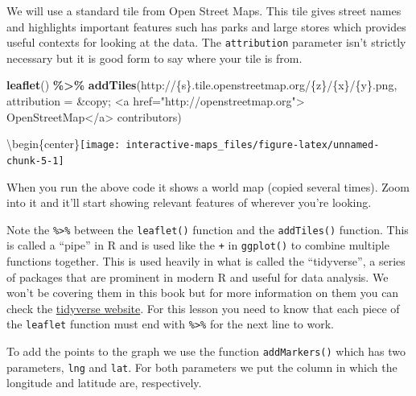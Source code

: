 \documentclass[
  12pt,
]{book}
\newenvironment{Shaded}{\begin{snugshade}}{\end{snugshade}}
\newcommand{\DataTypeTok}[1]{\textcolor[rgb]{0.13,0.29,0.53}{#1}}
\newcommand{\KeywordTok}[1]{\textcolor[rgb]{0.13,0.29,0.53}{\textbf{#1}}}
\newcommand{\NormalTok}[1]{#1}
\newcommand{\OperatorTok}[1]{\textcolor[rgb]{0.81,0.36,0.00}{\textbf{#1}}}
\newcommand{\StringTok}[1]{\textcolor[rgb]{0.31,0.60,0.02}{#1}}
\begin{document}
We will use a standard tile from Open Street Maps. This tile gives street names and highlights important features such has parks and large stores which provides useful contexts for looking at the data. The \texttt{attribution} parameter isn't strictly necessary but it is good form to say where your tile is from.

\begin{Shaded}
\begin{Highlighting}[]
\KeywordTok{leaflet}\NormalTok{() }\OperatorTok{\%>\%}\StringTok{ }
\StringTok{  }\KeywordTok{addTiles}\NormalTok{(}\StringTok{\textquotesingle{}http://\{s\}.tile.openstreetmap.org/\{z\}/\{x\}/\{y\}.png\textquotesingle{}}\NormalTok{, }
           \DataTypeTok{attribution =} \StringTok{\textquotesingle{}\&copy; <a href="http://openstreetmap.org">}
\StringTok{                OpenStreetMap</a> contributors\textquotesingle{}}\NormalTok{)}
\end{Highlighting}
\end{Shaded}

\textbackslash begin\{center\}\texttt{[image: interactive-maps\_files/figure-latex/unnamed-chunk-5-1]}

When you run the above code it shows a world map (copied several times). Zoom into it and it'll start showing relevant features of wherever you're looking.

Note the \texttt{\%\textgreater{}\%} between the \texttt{leaflet()} function and the \texttt{addTiles()} function. This is called a ``pipe'' in R and is used like the \texttt{+} in \texttt{ggplot()} to combine multiple functions together. This is used heavily in what is called the ``tidyverse'', a series of packages that are prominent in modern R and useful for data analysis. We won't be covering them in this book but for more information on them you can check the \href{https://www.tidyverse.org/}{tidyverse website}. For this lesson you need to know that each piece of the \texttt{leaflet} function must end with \texttt{\%\textgreater{}\%} for the next line to work.

To add the points to the graph we use the function \texttt{addMarkers()} which has two parameters, \texttt{lng} and \texttt{lat}. For both parameters we put the column in which the longitude and latitude are, respectively.

\begin{Shaded}
\end{Shaded}
\end{document}
